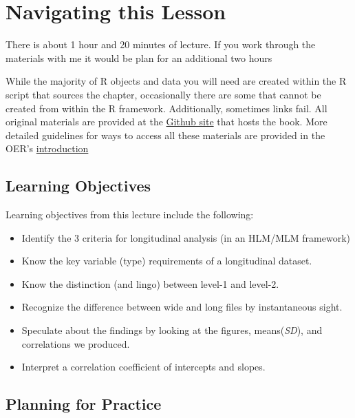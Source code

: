 \documentclass[
  11pt,
]{book}
\providecommand{\tightlist}{%
  \setlength{\itemsep}{0pt}\setlength{\parskip}{0pt}}
\begin{document}
\hypertarget{navigating-this-lesson-1}{%
\section{Navigating this Lesson}\label{navigating-this-lesson-1}}

There is about 1 hour and 20 minutes of lecture. If you work through the materials with me it would be plan for an additional two hours

While the majority of R objects and data you will need are created within the R script that sources the chapter, occasionally there are some that cannot be created from within the R framework. Additionally, sometimes links fail. All original materials are provided at the \href{https://github.com/lhbikos/ReC_CPA}{Github site} that hosts the book. More detailed guidelines for ways to access all these materials are provided in the OER's \protect\hyperlink{ReCintro}{introduction}

\hypertarget{learning-objectives-1}{%
\subsection{Learning Objectives}\label{learning-objectives-1}}

Learning objectives from this lecture include the following:

\begin{itemize}
\tightlist
\item
  Identify the 3 criteria for longitudinal analysis (in an HLM/MLM framework)
\item
  Know the key variable (type) requirements of a longitudinal dataset.
\item
  Know the distinction (and lingo) between level-1 and level-2.
\item
  Recognize the difference between wide and long files by instantaneous sight.
\item
  Speculate about the findings by looking at the figures, means(\emph{SD}), and correlations we produced.
\item
  Interpret a correlation coefficient of intercepts and slopes.
\end{itemize}

\hypertarget{planning-for-practice-1}{%
\subsection{Planning for Practice}\label{planning-for-practice-1}}
\end{document}
